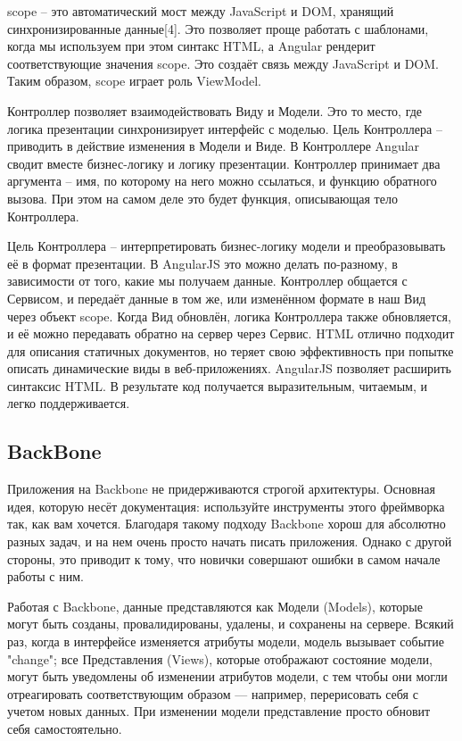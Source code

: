\textdollar scope – это автоматический мост между JavaScript и DOM, хранящий синхронизированные данные[4]. Это позволяет проще работать с шаблонами, когда мы используем при этом синтакс HTML, а Angular рендерит соответствующие значения \textdollar scope. Это создаёт связь между JavaScript и DOM. Таким образом, \textdollar scope играет роль ViewModel.

Контроллер позволяет взаимодействовать Виду и Модели. Это то место, где логика презентации синхронизирует интерфейс с моделью. Цель Контроллера – приводить в действие изменения в Модели и Виде. В Контроллере Angular сводит вместе бизнес-логику и логику презентации. Контроллер принимает два аргумента – имя, по которому на него можно ссылаться, и функцию обратного вызова. При этом на самом деле это будет функция, описывающая тело Контроллера.

Цель Контроллера – интерпретировать бизнес-логику модели и преобразовывать её в формат презентации. В AngularJS это можно делать по-разному, в зависимости от того, какие мы получаем данные.
Контроллер общается с Сервисом, и передаёт данные в том же, или изменённом формате в наш Вид через объект \textdollar scope. Когда Вид обновлён, логика Контроллера также обновляется, и её можно передавать обратно на сервер через Сервис.
HTML отлично подходит для описания статичных документов, но теряет свою эффективность при попытке описать динамические виды в веб-приложениях. AngularJS позволяет расширить синтаксис HTML. В результате код получается выразительным, читаемым, и легко поддерживается.

\subsection {BackBone}

Приложения на Backbone не придерживаются строгой архитектуры. Основная идея, которую несёт документация: используйте инструменты этого фреймворка так, как вам хочется. Благодаря такому подходу Backbone хорош для абсолютно разных задач, и на нем очень просто начать писать приложения. Однако с другой стороны, это приводит к тому, что новички совершают ошибки в самом начале работы с ним. 

Работая с Backbone, данные представляются как Модели (Models), которые могут быть созданы, провалидированы, удалены, и сохранены на сервере. Всякий раз, когда в интерфейсе изменяется атрибуты модели, модель вызывает событие "change"; все Представления (Views), которые отображают состояние модели, могут быть уведомлены об изменении атрибутов модели, с тем чтобы они могли отреагировать соответствующим образом — например, перерисовать себя с учетом новых данных. При изменении модели представление просто обновит себя самостоятельно.


